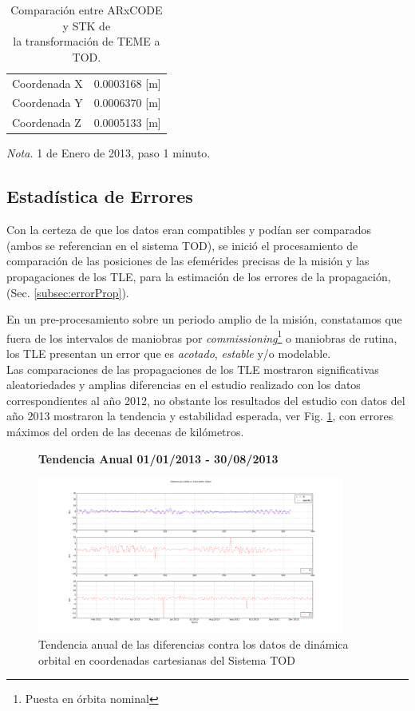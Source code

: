 \begin{table}
\caption{Comparaci\'on entre ARxCODE y STK de \\la transformaci\'on de TEME a TOD.}
\begin{tabular}{l|c}
  \hline
  Coordenada  X &  0.0003168 [m]\\
  Coordenada Y &  0.0006370 [m]\\
  Coordenada Z &  0.0005133 [m]\\
  \hline
\end{tabular}
\begin{flushleft}
\small {\it{Nota.}} 1 de Enero de 2013, paso 1 minuto.
\end{flushleft}

\end{table}

\subsection*{Estad\'istica de Errores}
Con la certeza de que los datos eran compatibles y pod\'ian ser comparados (ambos se referencian en el sistema TOD), se inici\'o el procesamiento de comparaci\'on de las posiciones de las efem\'erides precisas de la misi\'on y las propagaciones de los TLE, para la estimaci\'on de los errores de la propagaci\'on, (Sec. \ref{subsec:errorProp}).

En un pre-procesamiento sobre un periodo amplio de la misi\'on, constatamos que fuera de los intervalos de maniobras por {\it{commissioning}}\footnote{Puesta en \'orbita nominal} o maniobras de rutina, los TLE presentan un error que es {\it{acotado}}, {\it{estable}} y/o modelable. \\

Las comparaciones de las propagaciones de los TLE mostraron significativas aleatoriedades y amplias diferencias en el estudio realizado con los datos correspondientes al a\~no 2012, no obstante los resultados del estudio con datos del a\~no 2013 mostraron la tendencia y estabilidad esperada, ver Fig. \ref{fig:sacd2013}, con errores m\'aximos del orden de las decenas de kil\'ometros.


\begin{figure}[!h]
\centering
  \textbf{Tendencia Anual 01/01/2013 - 30/08/2013}\par\medskip
  \includegraphics[width=0.9\textwidth]{imagenes/SACD2013todEjesajustados}
  \caption{Tendencia anual de las diferencias contra los datos de din\'amica orbital en coordenadas cartesianas del Sistema TOD}
  \label{fig:sacd2013}
\end{figure}

